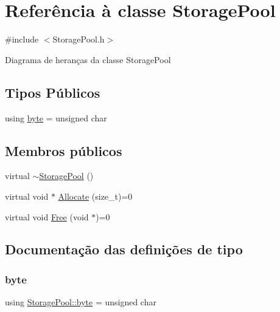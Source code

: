 \hypertarget{classStoragePool}{}\section{Referência à classe Storage\+Pool}
\label{classStoragePool}


{\ttfamily \#include $<$Storage\+Pool.\+h$>$}



Diagrama de heranças da classe Storage\+Pool
\subsection*{Tipos Públicos}
\begin{DoxyCompactItemize}
\item 
using \hyperlink{classStoragePool_a42aaba0b4f07cf26a94dbfabe853e3bd}{byte} = unsigned char
\end{DoxyCompactItemize}
\subsection*{Membros públicos}
\begin{DoxyCompactItemize}
\item 
virtual \hyperlink{classStoragePool_af762401e53c754fccb49703579bd3b31}{$\sim$\+Storage\+Pool} ()
\item 
virtual void $\ast$ \hyperlink{classStoragePool_a123a07b2fff40000102b401d7d1b5d5a}{Allocate} (size\+\_\+t)=0
\item 
virtual void \hyperlink{classStoragePool_a2120a75c4562735372d089685828b8df}{Free} (void $\ast$)=0
\end{DoxyCompactItemize}


\subsection{Documentação das definições de tipo}
\mbox{\label{classStoragePool_a42aaba0b4f07cf26a94dbfabe853e3bd}} 
\subsubsection{\texorpdfstring{byte}{byte}}
{\footnotesize\ttfamily using \hyperlink{classStoragePool_a42aaba0b4f07cf26a94dbfabe853e3bd}{Storage\+Pool\+::byte} =  unsigned char}



